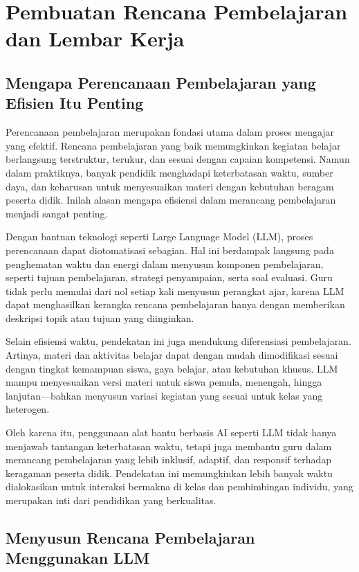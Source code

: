 \chapter{Pembuatan Rencana Pembelajaran dan Lembar Kerja}

\section{Mengapa Perencanaan Pembelajaran yang Efisien Itu Penting}

Perencanaan pembelajaran merupakan fondasi utama dalam proses mengajar yang efektif. Rencana pembelajaran yang baik memungkinkan kegiatan belajar berlangsung terstruktur, terukur, dan sesuai dengan capaian kompetensi. Namun dalam praktiknya, banyak pendidik menghadapi keterbatasan waktu, sumber daya, dan keharusan untuk menyesuaikan materi dengan kebutuhan beragam peserta didik. Inilah alasan mengapa efisiensi dalam merancang pembelajaran menjadi sangat penting.

Dengan bantuan teknologi seperti Large Language Model (LLM), proses perencanaan dapat diotomatisasi sebagian. Hal ini berdampak langsung pada penghematan waktu dan energi dalam menyusun komponen pembelajaran, seperti tujuan pembelajaran, strategi penyampaian, serta soal evaluasi. Guru tidak perlu memulai dari nol setiap kali menyusun perangkat ajar, karena LLM dapat menghasilkan kerangka rencana pembelajaran hanya dengan memberikan deskripsi topik atau tujuan yang diinginkan.

Selain efisiensi waktu, pendekatan ini juga mendukung diferensiasi pembelajaran. Artinya, materi dan aktivitas belajar dapat dengan mudah dimodifikasi sesuai dengan tingkat kemampuan siswa, gaya belajar, atau kebutuhan khusus. LLM mampu menyesuaikan versi materi untuk siswa pemula, menengah, hingga lanjutan—bahkan menyusun variasi kegiatan yang sesuai untuk kelas yang heterogen.

Oleh karena itu, penggunaan alat bantu berbasis AI seperti LLM tidak hanya menjawab tantangan keterbatasan waktu, tetapi juga membantu guru dalam merancang pembelajaran yang lebih inklusif, adaptif, dan responsif terhadap keragaman peserta didik. Pendekatan ini memungkinkan lebih banyak waktu dialokasikan untuk interaksi bermakna di kelas dan pembimbingan individu, yang merupakan inti dari pendidikan yang berkualitas.


\section{Menyusun Rencana Pembelajaran Menggunakan LLM}

